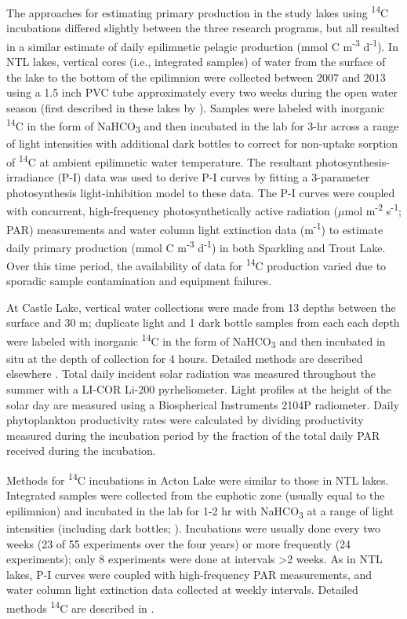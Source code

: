 \documentclass[12pt, oneside]{article}
\begin{document}
The approaches for estimating primary production in the study lakes using \textsuperscript{14}C incubations differed slightly between the three research programs, but all resulted in a similar estimate of daily epilimnetic pelagic production (mmol C m\textsuperscript{-3} d\textsuperscript{-1}). In NTL lakes, vertical cores (i.e., integrated samples) of water from the surface of the lake to the bottom of the epilimnion were collected between 2007 and 2013 using a 1.5 inch PVC tube approximately every two weeks during the open water season (first described in these lakes by \citealt{adams_primary_1993}). Samples were labeled with inorganic \textsuperscript{14}C in the form of NaHCO\textsubscript{3} and then incubated in the lab for 3-hr across a range of light intensities with additional dark bottles to correct for non-uptake sorption of \textsuperscript{14}C at ambient epilimnetic water temperature. The resultant photosynthesis-irradiance (P-I) data was used to derive P-I curves by fitting a 3-parameter photosynthesis light-inhibition model \citep{Platt_Gallegos_Harrison_1980} to these data. The P-I curves were coupled with concurrent, high-frequency photosynthetically active radiation ($\mu$mol m\textsuperscript{-2} s\textsuperscript{-1}; PAR) measurements and water column light extinction data (m\textsuperscript{-1}) to estimate daily primary production (mmol C m\textsuperscript{-3} d\textsuperscript{-1}) in both Sparkling and Trout Lake. Over this time period, the availability of data for \textsuperscript{14}C production varied due to sporadic sample contamination and equipment failures.

At Castle Lake, vertical water collections were made from 13 depths between the surface and 30 m; duplicate light and 1 dark bottle samples from each each depth were labeled with inorganic \textsuperscript{14}C in the form of NaHCO\textsubscript{3} and then incubated in situ at the depth of collection for 4 hours. Detailed methods are described elsewhere \citep{Goldman_Mason_Wood_1963, Goldman_1968}. Total daily incident solar radiation was measured throughout the summer with a LI-COR Li-200 pyrheliometer. Light profiles at the height of the solar day are measured using a Biospherical Instruments 2104P radiometer. Daily phytoplankton productivity rates were calculated by dividing productivity measured during the incubation period by the fraction of the total daily PAR received during the incubation.

Methods for \textsuperscript{14}C incubations in Acton Lake were similar to those in NTL lakes. Integrated samples were collected from the euphotic zone (usually equal to the epilimnion) and incubated in the lab for 1-2 hr with NaHCO\textsubscript{3} at a range of light intensities (including dark bottles; \citealt{fee1990computer}). Incubations were usually done every two weeks (23 of 55 experiments over the four years) or more frequently (24 experiments); only 8 experiments were done at intervals >2 weeks. As in NTL lakes, P-I curves were coupled with high-frequency PAR  measurements, and water column light extinction data collected at weekly intervals. Detailed methods \textsuperscript{14}C are described in \citet{Knoll_Vanni_Renwick_2003}.  
\end{document}
